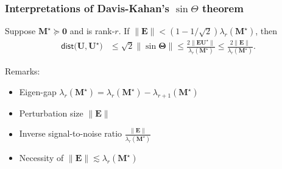 \documentclass[compress,
mathserif,wide,%
]{beamer}
\begin{document}
\begin{frame}
	\frametitle{Interpretations of Davis-Kahan's $\sin\Theta$ theorem}
	
{

\begin{varblock}[\textwidth]{}
Suppose $\bm{M}^\star \succeq \bm{0}$ and is rank-$r$. If $\|\bm{E}\| < (1 - 1/ \sqrt{2}) \lambda_{r}(\bm{M}^\star)$, then
\begin{subequations}
\label{eq:davis-kahan-conclusion-corollary}
\begin{align*}
\mathsf{dist}\big(\bm{U},\bm{U}^{\star}\big) & \leq\sqrt{2}\|\sin\bm{\Theta}\|\leq\frac{2 \big\|\bm{E}\bm{U}^{\star}\big\|}{\lambda_{r}(\bm{M}^\star)}\leq\frac{2\|\bm{E}\|}{\lambda_{r}(\bm{M}^\star)}.
\end{align*}
\end{subequations}
\end{varblock}
}


\vfill 
Remarks: 
	\begin{itemize}
	\itemsep0.5em
	\item Eigen-gap $\lambda_{r}(\bm{M}^{\star}) = \lambda_{r}(\bm{M}^{\star}) - \lambda_{r+1}(\bm{M}^{\star})$
	\item Perturbation size $\|\bm{E}\|$
	\item Inverse signal-to-noise ratio $\frac{\|\bm{E}\|}{\lambda_{r}(\bm{M}^\star)}$
	\item Necessity of $\|\bm{E}\| \lesssim \lambda_{r}(\bm{M}^\star)$
\end{itemize}
\end{frame}
\end{document}

